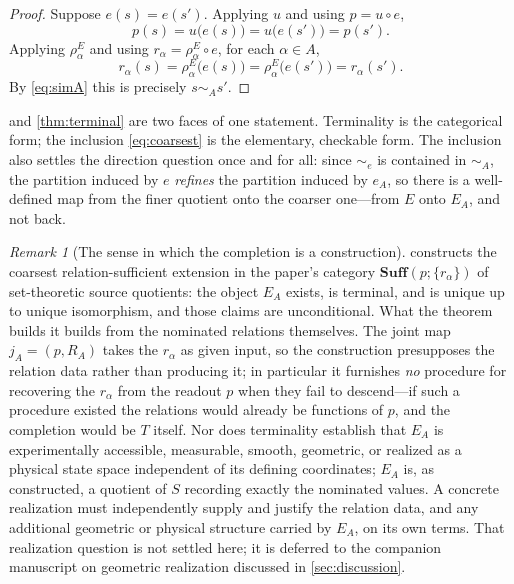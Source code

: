 \documentclass[11pt,reqno]{amsart}
\theoremstyle{plain}
\theoremstyle{definition}
\theoremstyle{remark}
\newtheorem{remark}[theorem]{Remark}
\numberwithin{equation}{section}
\begin{document}
\begin{proof}
Suppose $e(s)=e(s')$. Applying $u$ and using $p=u\circ e$,
\[
p(s)=u\bigl(e(s)\bigr)=u\bigl(e(s')\bigr)=p(s') .
\]
Applying $\rho_\alpha^E$ and using $r_\alpha=\rho_\alpha^E\circ e$, for each $\alpha\in A$,
\[
r_\alpha(s)=\rho_\alpha^E\bigl(e(s)\bigr)=\rho_\alpha^E\bigl(e(s')\bigr)=r_\alpha(s') .
\]
By \eqref{eq:simA} this is precisely $s\sim_A s'$.
\end{proof}

 and \cref{thm:terminal} are two faces of one statement. Terminality is the
categorical form; the inclusion \eqref{eq:coarsest} is the elementary, checkable form. The
inclusion also settles the direction question once and for all: since $\sim_e$ is contained in
$\sim_A$, the partition induced by $e$ \emph{refines} the partition induced by $e_A$, so there is a
well-defined map from the finer quotient onto the coarser one---from $E$ onto $E_A$, and not back.

\begin{remark}[The sense in which the completion is a construction]
\label{rem:construction-scope}
 constructs the coarsest relation-sufficient extension in the paper's category
$\mathbf{Suff}(p;\{r_\alpha\})$ of set-theoretic source quotients: the object $E_A$ exists, is
terminal, and is unique up to unique isomorphism, and those claims are unconditional. What the
theorem builds it builds from the nominated relations themselves. The joint map
$j_A=(p,R_A)$ takes the $r_\alpha$ as given input, so the construction presupposes the relation
data rather than producing it; in particular it furnishes \emph{no} procedure for recovering the
$r_\alpha$ from the readout $p$ when they fail to descend---if such a procedure existed the
relations would already be functions of $p$, and the completion would be $T$ itself. Nor does
terminality establish that $E_A$ is experimentally accessible, measurable, smooth, geometric, or
realized as a physical state space independent of its defining coordinates; $E_A$ is, as
constructed, a quotient of $S$ recording exactly the nominated values. A concrete realization must
independently supply and justify the relation data, and any additional geometric or physical
structure carried by $E_A$, on its own terms. That realization question is not settled here; it is
deferred to the companion manuscript on geometric realization discussed in \cref{sec:discussion}.
\end{remark}
\end{document}
